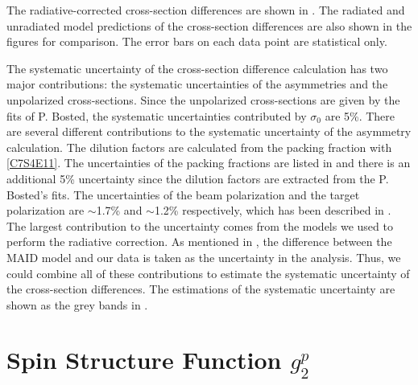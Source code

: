 The radiative-corrected cross-section differences are shown in . The radiated and unradiated model predictions of the cross-section differences are also shown in the figures for comparison. The error bars on each data point are statistical only.

The systematic uncertainty of the cross-section difference calculation has two major contributions: the systematic uncertainties of the asymmetries and the unpolarized cross-sections. Since the unpolarized cross-sections are given by the fits of P. Bosted, the systematic uncertainties contributed by $\sigma_0$ are 5\%. There are several different contributions to the systematic uncertainty of the asymmetry calculation. The dilution factors are calculated from the packing fraction with \cref{C7S4E11}. The uncertainties of the packing fractions are listed in  and there is an additional 5\% uncertainty since the dilution factors are extracted from the P. Bosted's fits. The uncertainties of the beam polarization and the target polarization are $\sim$1.7\% and $\sim$1.2\% respectively, which has been described in . The largest contribution to the uncertainty comes from the models we used to perform the radiative correction. As mentioned in , the difference between the MAID model and our data is taken as the uncertainty in the analysis. Thus, we could combine all of these contributions to estimate the systematic uncertainty of the cross-section differences. The estimations of the systematic uncertainty are shown as the grey bands in .

\section{\texorpdfstring{Spin Structure Function $g_2^p$}{Spin Structure Function g2p}}
\label{C8S4}

